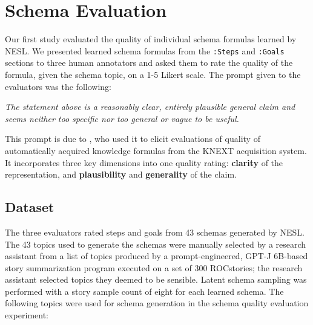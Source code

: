 \section{Schema Evaluation}
\label{sec:schema_eval}
Our first study evaluated the quality of individual schema formulas learned by NESL. We presented learned schema formulas from the \texttt{:Steps} and \texttt{:Goals} sections to three human annotators and asked them to rate the quality of the formula, given the schema topic, on a 1-5 Likert scale. The prompt given to the evaluators was the following:
\begin{displayquote}
\textit{The statement above is a reasonably clear, entirely plausible general claim and seems neither too specific nor too general or vague to be useful.}
\end{displayquote}
This prompt is due to \citet{knext-eval}, who used it to elicit evaluations of quality of automatically acquired knowledge formulas from the \textsc{KNEXT} acquisition system. It incorporates three key dimensions into one quality rating: \textbf{clarity} of the representation, and \textbf{plausibility} and \textbf{generality} of the claim.

\subsection{Dataset}
The three evaluators rated steps and goals from 43 schemas generated by NESL. The 43 topics used to generate the schemas were manually selected by a research assistant from a list of topics produced by a prompt-engineered, GPT-J 6B-based story summarization program executed on a set of 300 ROCstories; the research assistant selected topics they deemed to be sensible. Latent schema sampling was performed with a story sample count of eight for each learned schema. The following topics were used for schema generation in the schema quality evaluation experiment:

